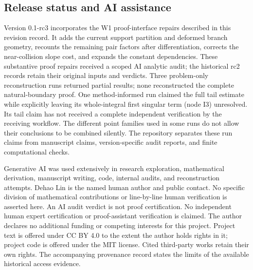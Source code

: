 \documentclass[11pt]{article}
\numberwithin{equation}{section}
\theoremstyle{definition}
\begin{document}
\subsection*{Release status and AI assistance}
Version 0.1-rc3 incorporates the W1 proof-interface repairs described in this revision record.
It adds the current support partition and deformed branch geometry,
recounts the remaining pair factors after differentiation, corrects
the near-collision slope cost, and expands the constant dependencies.
These substantive proof repairs received a scoped AI analytic audit;
the historical rc2 records retain their original inputs and verdicts.
Three problem-only reconstruction runs returned partial results;
none reconstructed the complete natural-boundary proof. One
method-informed run claimed the full tail estimate while explicitly
leaving its whole-integral first singular term (node I3) unresolved.
Its tail claim has not received a complete independent verification
by the receiving workflow. The different point families used in
some runs do not allow their conclusions to be combined silently.
The repository separates these run claims from manuscript claims,
version-specific audit reports, and finite computational checks.

Generative AI was used extensively in research exploration,
mathematical derivation, manuscript writing, code, internal audits,
and reconstruction attempts. Dehao Lin is the named human author
and public contact. No specific division of mathematical contributions
or line-by-line human verification is asserted here.
An AI audit verdict is not proof certification. No independent human
expert certification or proof-assistant verification is claimed.
The author declares no additional funding or competing interests
for this project. Project text is offered under CC BY 4.0 to the extent
the author holds rights in it; project code is offered under the MIT
license. Cited third-party works retain their own rights.
The accompanying provenance record states
the limits of the available historical access evidence.
\end{document}
